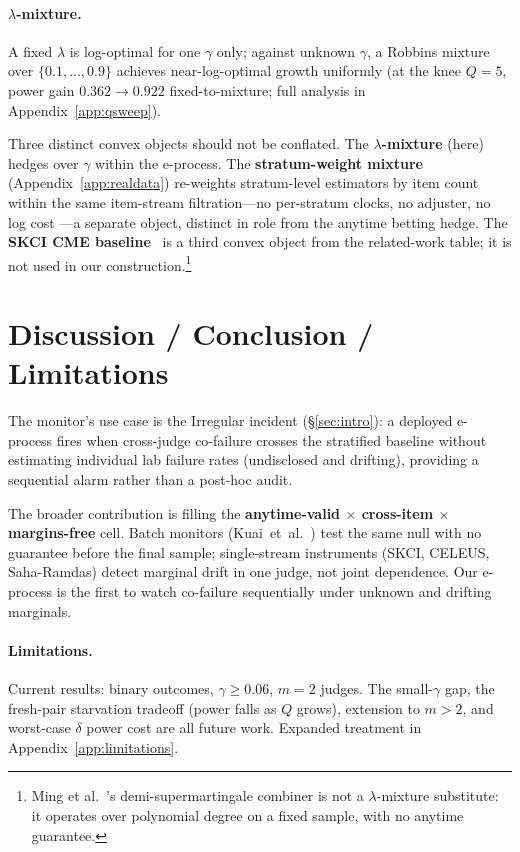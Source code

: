 \documentclass{article}
\begin{document}
\paragraph{$\lambda$-mixture.}
A fixed $\lambda$ is log-optimal for one $\gamma$ only; against unknown $\gamma$,
a Robbins mixture over $\{0.1,\ldots,0.9\}$ achieves near-log-optimal growth
uniformly (at the knee $Q=5$, power gain $0.362\to0.922$ fixed-to-mixture; full
analysis in Appendix~\ref{app:qsweep}).

Three distinct convex objects should not be conflated. The
\textbf{$\lambda$-mixture} (here) hedges over $\gamma$ within the e-process. The
\textbf{stratum-weight mixture} (Appendix~\ref{app:realdata}) re-weights
stratum-level estimators by item count within the same item-stream filtration---no per-stratum clocks, no adjuster, no log cost \citep{choeRamdas2402}---a separate object, distinct in role from
the anytime betting hedge. The \textbf{SKCI CME baseline}~\citep{he2606} is a
third convex object from the related-work table; it is not used in our
construction.\footnote{Ming et al.~\citep{ming2603}'s demi-supermartingale
combiner is not a $\lambda$-mixture substitute: it operates over polynomial degree
on a fixed sample, with no anytime guarantee.}

\section{Discussion / Conclusion / Limitations}
\label{sec:discussion}

The monitor's use case is the Irregular incident (\S\ref{sec:intro}): a deployed
e-process fires when cross-judge co-failure crosses the stratified baseline
without estimating individual lab failure rates (undisclosed and drifting),
providing a sequential alarm rather than a post-hoc audit.

The broader contribution is filling the \textbf{anytime-valid $\times$ cross-item
$\times$ margins-free} cell. Batch monitors (Kuai~et~al.\ \citep{kuai2604}) test
the same null with no guarantee before the final sample; single-stream instruments
(SKCI, CELEUS, Saha-Ramdas) detect marginal drift in one judge, not joint
dependence. Our e-process is the first to watch co-failure sequentially under
unknown and drifting marginals.

\paragraph{Limitations.}
Current results: binary outcomes, $\gamma\ge0.06$, $m=2$ judges. The small-$\gamma$
gap, the fresh-pair starvation tradeoff (power falls as $Q$ grows), extension to
$m>2$, and worst-case $\delta$ power cost are all future work.
Expanded treatment in Appendix~\ref{app:limitations}.
\end{document}
